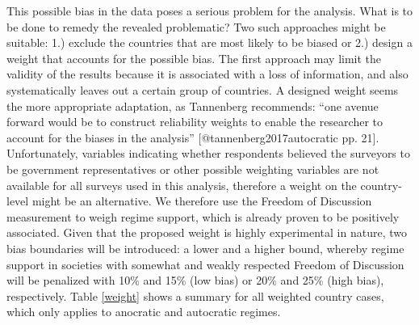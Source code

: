 \documentclass[]{article}
\begin{document}
This possible bias in the data poses a serious problem for the analysis.
What is to be done to remedy the revealed problematic? Two such
approaches might be suitable: 1.) exclude the countries that are most
likely to be biased or 2.) design a weight that accounts for the
possible bias. The first approach may limit the validity of the results
because it is associated with a loss of information, and also
systematically leaves out a certain group of countries. A designed
weight seems the more appropriate adaptation, as Tannenberg recommends:
``one avenue forward would be to construct reliability weights to enable
the researcher to account for the biases in the analysis''
{[}@tannenberg2017autocratic pp. 21{]}. Unfortunately, variables
indicating whether respondents believed the surveyors to be government
representatives or other possible weighting variables are not available
for all surveys used in this analysis, therefore a weight on the
country-level might be an alternative. We therefore use the Freedom of
Discussion measurement to weigh regime support, which is already proven
to be positively associated. Given that the proposed weight is highly
experimental in nature, two bias boundaries will be introduced: a lower
and a higher bound, whereby regime support in societies with somewhat
and weakly respected Freedom of Discussion will be penalized with 10\%
and 15\% (low bias) or 20\% and 25\% (high bias), respectively. Table
\ref{weight} shows a summary for all weighted country cases, which only
applies to anocratic and autocratic regimes.
\end{document}
